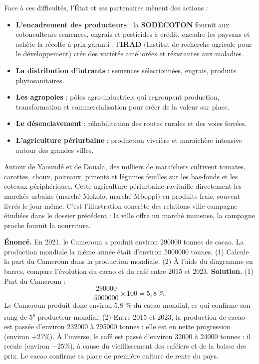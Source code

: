 \documentclass[11pt]{article}
\newcommand{\cle}[1]{{\popxbold\color{popdark}#1}}
\newcounter{popsec}
\newcounter{popsub}
\newcommand{\courssub}[1]{%
  \stepcounter{popsub}%
  \par\vspace{9pt}\noindent{\popxbold\fontsize{11.5}{13}\selectfont\color{popink}{\color{poporange}\thepopsec.\thepopsub}\hspace{6pt}#1}\par\nopagebreak\vspace{4pt}
}
\begin{document}
\courssub{Les efforts de modernisation}

Face à ces difficultés, l'État et ses partenaires mènent des actions :

\begin{itemize}
\item \textbf{L'encadrement des producteurs} : la \textbf{SODECOTON} fournit aux cotonculteurs semences, engrais et pesticides à crédit, encadre les paysans et achète la récolte à prix garanti ; l'\textbf{IRAD} (Institut de recherche agricole pour le développement) crée des variétés améliorées et résistantes aux maladies.
\item \textbf{La distribution d'intrants} : semences sélectionnées, engrais, produits phytosanitaires.
\item \textbf{Les agropoles} : pôles agro-industriels qui regroupent production, transformation et commercialisation pour créer de la valeur sur place.
\item \textbf{Le désenclavement} : réhabilitation des routes rurales et des voies ferrées.
\item \textbf{L'agriculture périurbaine} : production vivrière et maraîchère intensive autour des grandes villes.
\end{itemize}

\begin{savaistu}
Autour de Yaoundé et de Douala, des milliers de maraîchers cultivent tomates, carottes, choux, poireaux, piments et légumes feuilles sur les bas-fonds et les coteaux périphériques. Cette \cle{agriculture périurbaine} ravitaille directement les marchés urbains (marché Mokolo, marché Mboppi) en produits frais, souvent livrés le jour même. C'est l'illustration concrète des relations ville-campagne étudiées dans le dossier précédent : la ville offre un marché immense, la campagne proche fournit la nourriture.
\end{savaistu}

\begin{exoresolu}
\textbf{Énoncé.} En 2021, le Cameroun a produit environ \num{290000} tonnes de cacao. La production mondiale la même année était d'environ \num{5000000} tonnes. (1) Calcule la part du Cameroun dans la production mondiale. (2) À l'aide du diagramme en barres, compare l'évolution du cacao et du café entre 2015 et 2023.
\tcblower
\textbf{Solution.} (1) Part du Cameroun :
\[
\frac{290000}{5000000}\times 100 = 5,8\ \%.
\]
Le Cameroun produit donc environ 5,8 \% du cacao mondial, ce qui confirme son rang de 5\textsuperscript{e} producteur mondial.
(2) Entre 2015 et 2023, la production de cacao est passée d'environ \num{232000} à \num{295000} tonnes : elle est en nette progression (environ $+27\%$). À l'inverse, le café est passé d'environ \num{32000} à \num{24000} tonnes : il recule (environ $-25\%$), à cause du vieillissement des caféiers et de la baisse des prix. Le cacao confirme sa place de première culture de rente du pays.
\end{exoresolu}
\end{document}
